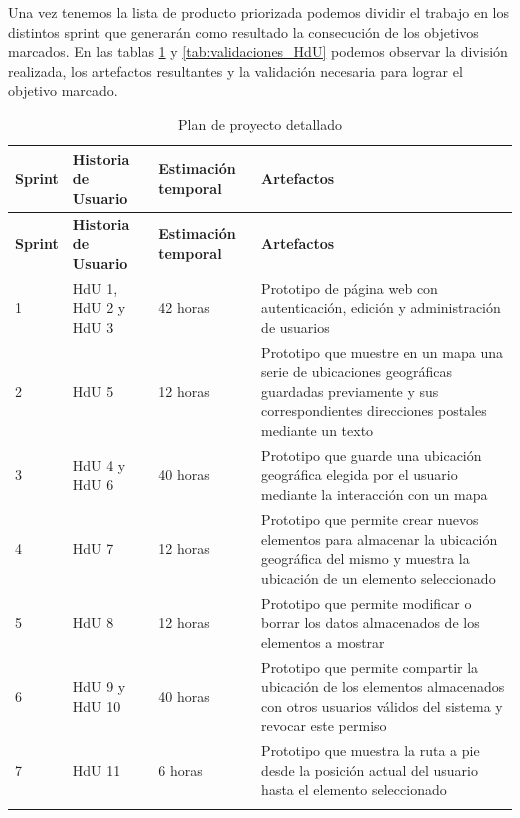 Una vez tenemos la lista de producto priorizada podemos dividir el trabajo en los distintos sprint que generarán como resultado la consecución de los objetivos marcados. En las tablas \ref{tab:plan_proyecto} y \ref{tab:validaciones_HdU} podemos observar la división realizada, los artefactos resultantes y la validación necesaria para lograr el objetivo marcado.

\begin{longtable}{p{1cm} p{4cm} p{4cm} p{6cm}}
  	\hline  	    
  	\multicolumn{1}{p{1cm}}{\cellcolor{black!30}\textbf{Sprint}} &
    \multicolumn{1}{p{4cm}}{\cellcolor{black!30}\textbf{Historia de Usuario}} & 
 	\multicolumn{1}{p{4cm}}{\cellcolor{black!30}\textbf{Estimación temporal}} &
 	\multicolumn{1}{p{6cm}}{\cellcolor{black!30}\textbf{Artefactos}}
 	\\
 	\toprule 
   	\endfirsthead
     
    \hline
  	\multicolumn{1}{p{1cm}}{\cellcolor{black!30}\textbf{Sprint}} &
    \multicolumn{1}{p{4cm}}{\cellcolor{black!30}\textbf{Historia de Usuario}} & 
 	\multicolumn{1}{p{4cm}}{\cellcolor{black!30}\textbf{Estimación temporal}} &
 	\multicolumn{1}{p{6cm}}{\cellcolor{black!30}\textbf{Artefactos}}
 	\\	 
 	\toprule
 	\endhead

	\rowcolor{gray!25}
	1	& HdU 1, HdU 2 y HdU 3	&	42 horas	&	Prototipo de página web con autenticación, edición y administración de usuarios \\ 
	2	& HdU 5					&	12 horas	&	Prototipo que muestre en un mapa una serie de ubicaciones geográficas guardadas previamente y sus correspondientes direcciones postales mediante un texto \\
	\rowcolor{gray!25}
	3	& HdU 4	y HdU 6				&	40 horas	&	Prototipo que guarde una ubicación geográfica elegida por el usuario mediante la interacción con un mapa \\
	4	& HdU 7					&	12 horas	&	Prototipo que permite crear nuevos elementos para almacenar la ubicación geográfica del mismo y muestra la ubicación de un elemento seleccionado \\
	\rowcolor{gray!25}
	5	& HdU 8					&	12 horas	&	Prototipo que permite modificar o borrar los datos almacenados de los elementos a mostrar \\
	\rowcolor{gray!25}
	6	& HdU 9 y HdU 10		&	40 horas	&	Prototipo que permite compartir la ubicación de los elementos almacenados con otros usuarios válidos del sistema y revocar este permiso \\
	7	& HdU 11				&	6 horas		&	Prototipo que muestra la ruta a pie desde la posición actual del usuario hasta el elemento seleccionado \\

	\hline
	\caption{Plan de proyecto detallado}
	\label{tab:plan_proyecto}
\end{longtable}

